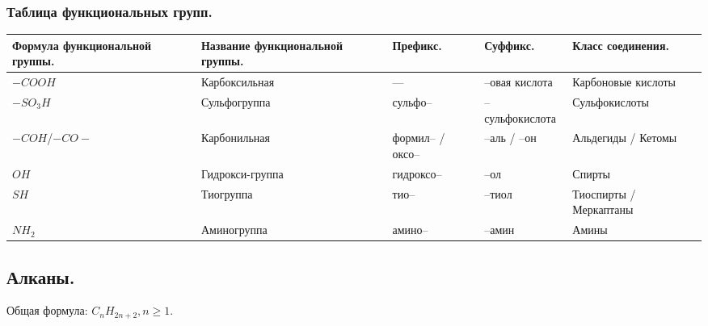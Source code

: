 \documentclass[12pt]{article}
\begin{document}
	\subsubsection{Таблица функциональных групп.}
	\begin{xltabular}{\textwidth}{|X|X|X|X|X|}
		\hline
		Формула функциональной группы. & Название функциональной группы. & Префикс. & Суффикс. & Класс соединения. \\
		\hline
		$-COOH$ & Карбоксильная & --- & --овая кислота & Карбоновые кислоты \\
		\hline
		$-SO_3H$ & Сульфогруппа & сульфо-- & --сульфокислота & Сульфокислоты \\
		\hline
		$-COH$/$-CO-$ & Карбонильная & формил-- / оксо-- & --аль / --он & Альдегиды / Кетомы \\
		\hline
		$OH$ & Гидрокси-группа & гидроксо-- & --ол & Спирты \\
		\hline
		$SH$ & Тиогруппа & тио-- & --тиол & Тиоспирты / Меркаптаны \\
		\hline
		$NH_2$ & Аминогруппа & амино-- & --амин & Амины \\
		\hline
	\end{xltabular}
	\subsection{Алканы.}
	Общая формула: $C_nH_{2n + 2}, n \geqslant 1$.
\end{document}
